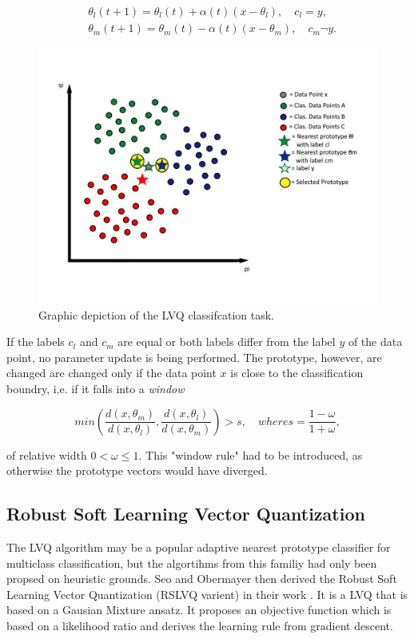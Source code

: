 \documentclass[12pt,oneside,a4paper,parskip]{scrbook}
\begin{document}
\begin{equation}
  \begin{split}
    &\theta_l(t+1) = \theta_l(t) + \alpha(t)(x-\theta_l), \quad c_l = y,\\
    &\theta_m(t+1) = \theta_m(t) - \alpha(t)(x-\theta_m), \quad c_m \neg y.
  \end{split}
  \label{equ:LVQ3}
\end{equation}

\begin{figure}[H]
  \includegraphics[width=0.75\linewidth]{LVQ}
  \caption{Graphic depiction of the LVQ classifcation task.}
  \label{fig:LVQ}
\end{figure}

If the labels $c_l$ and $c_m$ are equal or both labels differ from the label $y$ of the data point, no parameter update is being performed.
The prototype, however, are changed are changed only if the data point $x$ is close to the classification boundry, i.e.
if it falls into a \textit{window}

\begin{equation}
    min(\frac{d(x,\theta_m)}{d(x,\theta_l)},\frac{d(x,\theta_l)}{d(x,\theta_m)}) > s, \quad where s = \frac{1-\omega}{1+\omega},
\end{equation}

of relative width $0<\omega\leq1$. This "window rule" had to be introduced, as otherwise the prototype vectors would have diverged. \cite{RSLVQOrig}

\subsection{Robust Soft Learning Vector Quantization}

The LVQ algorithm may be a popular adaptive nearest prototype classifier for multiclass classification, 
but the algortihms from this familiy had only been propsed on heuristic grounds. Seo and Obermayer then derived the 
Robust Soft Learning Vector Quantization (RSLVQ varient) in their work \cite{RSLVQOrig}. It is a LVQ that is based on 
a Gausian Mixture ansatz. It proposes an objective function which is based on a likelihood ratio and derives the
learning rule from gradient descent.
\end{document}
